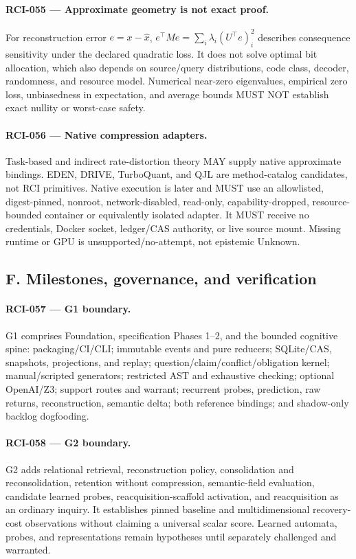\documentclass[11pt]{article}
\begin{document}
\paragraph{RCI-055 --- Approximate geometry is not exact proof.}
For reconstruction error \(e=x-\hat x\),
\(e^\top M e=\sum_i\lambda_i(U^\top e)_i^2\) describes consequence
sensitivity under the declared quadratic loss. It does not solve optimal bit
allocation, which also depends on source/query distributions, code class,
decoder, randomness, and resource model. Numerical near-zero eigenvalues,
empirical zero loss, unbiasedness in expectation, and average bounds MUST NOT
establish exact nullity or worst-case safety.

\paragraph{RCI-056 --- Native compression adapters.}
Task-based and indirect rate-distortion theory MAY supply native approximate
bindings. EDEN, DRIVE, TurboQuant, and QJL are method-catalog candidates, not
RCI primitives. Native execution is later and MUST use an allowlisted,
digest-pinned, nonroot, network-disabled, read-only, capability-dropped,
resource-bounded container or equivalently isolated adapter. It MUST receive no
credentials, Docker socket, ledger/CAS authority, or live source mount.
Missing runtime or GPU is unsupported/no-attempt, not epistemic Unknown.

\subsection{F. Milestones, governance, and verification}

\paragraph{RCI-057 --- G1 boundary.}
G1 comprises Foundation, specification Phases 1--2, and the bounded cognitive
spine: packaging/CI/CLI; immutable events and pure reducers; SQLite/CAS,
snapshots, projections, and replay; question/claim/conflict/obligation kernel;
manual/scripted generators; restricted AST and exhaustive checking; optional
OpenAI/Z3; support routes and warrant; recurrent probes, prediction, raw
returns, reconstruction, semantic delta; both reference bindings; and
shadow-only backlog dogfooding.

\paragraph{RCI-058 --- G2 boundary.}
G2 adds relational retrieval, reconstruction policy, consolidation and
reconsolidation, retention without compression, semantic-field evaluation,
candidate learned probes, reacquisition-scaffold activation, and reacquisition
as an ordinary inquiry. It establishes pinned baseline and multidimensional
recovery-cost observations without claiming a universal scalar score. Learned
automata, probes, and representations remain hypotheses until separately
challenged and warranted.
\end{document}

